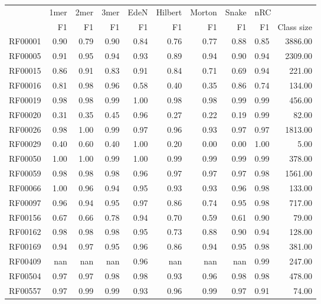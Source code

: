 \begin{tabular}{lrrrrrrrrr}
\toprule
{} & 1mer & 2mer & 3mer & EdeN & Hilbert & Morton & Snake & \multicolumn{2}{l}{nRC} \\
{} &   F1 &   F1 &   F1 &   F1 &      F1 &     F1 &    F1 &   F1 & Class size \\
\midrule
RF00001      & 0.90 & 0.79 & 0.90 & 0.84 &    0.76 &   0.77 &  0.88 & 0.85 &    3886.00 \\
RF00005      & 0.91 & 0.95 & 0.94 & 0.93 &    0.89 &   0.94 &  0.90 & 0.94 &    2309.00 \\
RF00015      & 0.86 & 0.91 & 0.83 & 0.91 &    0.84 &   0.71 &  0.69 & 0.94 &     221.00 \\
RF00016      & 0.81 & 0.98 & 0.96 & 0.58 &    0.40 &   0.35 &  0.86 & 0.74 &     134.00 \\
RF00019      & 0.98 & 0.98 & 0.99 & 1.00 &    0.98 &   0.98 &  0.99 & 0.99 &     456.00 \\
RF00020      & 0.31 & 0.35 & 0.45 & 0.96 &    0.27 &   0.22 &  0.19 & 0.99 &      82.00 \\
RF00026      & 0.98 & 1.00 & 0.99 & 0.97 &    0.96 &   0.93 &  0.97 & 0.97 &    1813.00 \\
RF00029      & 0.40 & 0.60 & 0.40 & 1.00 &    0.20 &   0.00 &  0.00 & 1.00 &       5.00 \\
RF00050      & 1.00 & 1.00 & 0.99 & 1.00 &    0.99 &   0.99 &  0.99 & 0.99 &     378.00 \\
RF00059      & 0.98 & 0.98 & 0.98 & 0.96 &    0.97 &   0.97 &  0.97 & 0.98 &    1561.00 \\
RF00066      & 1.00 & 0.96 & 0.94 & 0.95 &    0.93 &   0.93 &  0.96 & 0.98 &     133.00 \\
RF00097      & 0.96 & 0.94 & 0.95 & 0.97 &    0.86 &   0.74 &  0.95 & 0.98 &     717.00 \\
RF00156      & 0.67 & 0.66 & 0.78 & 0.94 &    0.70 &   0.59 &  0.61 & 0.90 &      79.00 \\
RF00162      & 0.98 & 0.98 & 0.98 & 0.95 &    0.73 &   0.88 &  0.90 & 0.94 &     128.00 \\
RF00169      & 0.94 & 0.97 & 0.95 & 0.96 &    0.86 &   0.94 &  0.95 & 0.98 &     381.00 \\
RF00409      &  nan &  nan &  nan & 0.96 &     nan &    nan &   nan & 0.99 &     247.00 \\
RF00504      & 0.97 & 0.97 & 0.98 & 0.98 &    0.93 &   0.96 &  0.98 & 0.98 &     478.00 \\
RF00557      & 0.97 & 0.99 & 0.99 & 0.93 &    0.96 &   0.99 &  0.97 & 0.91 &      74.00 \\

\end{tabular}
